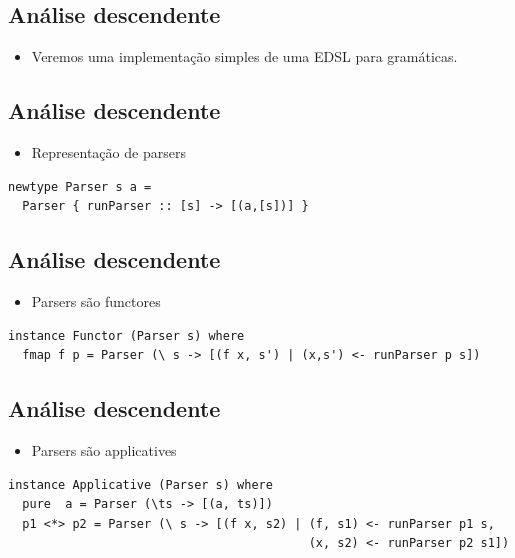 \documentclass[11pt]{article}
\begin{document}
\subsection*{Análise descendente}
\label{sec:org68852cb}

\begin{itemize}
\item Veremos uma implementação simples de uma EDSL para gramáticas.
\end{itemize}
\subsection*{Análise descendente}
\label{sec:orgbec569e}

\begin{itemize}
\item Representação de parsers
\end{itemize}

\begin{verbatim}
newtype Parser s a =
  Parser { runParser :: [s] -> [(a,[s])] }
\end{verbatim}
\subsection*{Análise descendente}
\label{sec:orge5dd1b0}

\begin{itemize}
\item Parsers são functores
\end{itemize}

\begin{verbatim}
instance Functor (Parser s) where
  fmap f p = Parser (\ s -> [(f x, s') | (x,s') <- runParser p s]) 
\end{verbatim}
\subsection*{Análise descendente}
\label{sec:org890e03b}

\begin{itemize}
\item Parsers são applicatives
\end{itemize}

\begin{verbatim}
instance Applicative (Parser s) where
  pure  a = Parser (\ts -> [(a, ts)])
  p1 <*> p2 = Parser (\ s -> [(f x, s2) | (f, s1) <- runParser p1 s,
                                          (x, s2) <- runParser p2 s1])
\end{verbatim}
\end{document}
